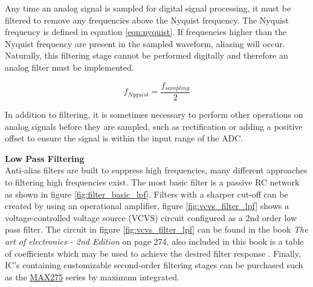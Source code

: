 Any time an analog signal is sampled for digital signal processing, it must be filtered to remove any frequencies above the Nyquist frequency. The Nyquist frequency is defined in equation \ref{eqn:nyquist}. If frequencies higher than the Nyquist frequency are present in the sampled waveform, aliasing will occur. Naturally, this filtering stage cannot be performed digitally and therefore an analog filter must be implemented.

\begin{equation}
f_{Nyquist} = \frac{f_{sampling}}{2}
\label{eqn:nyquist}
\end{equation}


In addition to filtering, it is sometimes necessary to perform other operations on analog signals before they are sampled, such as rectification or adding a positive offset to ensure the signal is within the input range of the ADC.

\textbf{Low Pass Filtering}\\
Anti-alias filters are built to suppress high frequencies, many different approaches to filtering high frequencies exist. The most basic filter is a passive RC network as shown in figure \ref{fig:filter_basic_lpf}. Filters with a sharper cut-off can be created by using an operational amplifier, figure \ref{fig:vcvs_filter_lpf} shows a voltage-controlled voltage source (VCVS) circuit configured as a 2nd order low pass filter. The circuit in figure \ref{fig:vcvs_filter_lpf} can be found in the book \textit{The art of electronics - 2nd Edition} on page 274, also included in this book is a table of coefficients which may be used to achieve the desired filter response \cite{Horowitz1995}. Finally, IC's containing customizable second-order filtering stages can be purchased such as the \href{https://www.maximintegrated.com/en/products/analog/analog-filters/MAX275.html/tb_tab0}{MAX275} series by maximum integrated.

